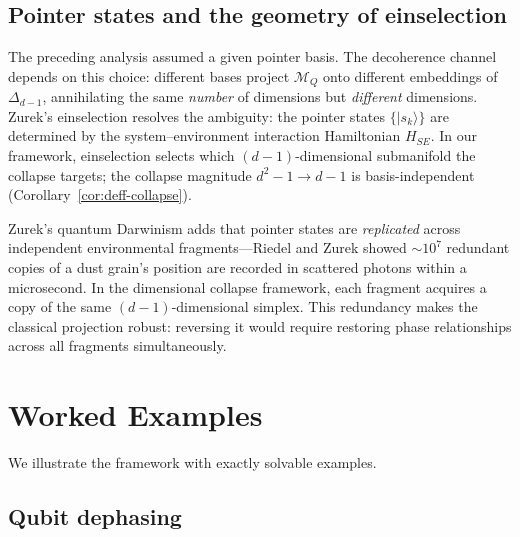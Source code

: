 \documentclass[12pt,a4paper]{article}
\theoremstyle{definition}
\theoremstyle{remark}
\begin{document}
\subsection{Pointer states and the geometry of einselection}
\label{sec:pointer}

The preceding analysis assumed a given pointer basis.  The decoherence channel depends on this choice: different bases project $\mathcal{M}_Q$ onto different embeddings of $\Delta_{d-1}$, annihilating the same \emph{number} of dimensions but \emph{different} dimensions.  Zurek's einselection \cite{zurek2003decoherence,zurek2025decoherence} resolves the ambiguity: the pointer states $\{|s_k\rangle\}$ are determined by the system--environment interaction Hamiltonian $H_{SE}$.  In our framework, einselection selects which $(d-1)$-dimensional submanifold the collapse targets; the collapse magnitude $d^2 - 1 \to d - 1$ is basis-independent (Corollary~\ref{cor:deff-collapse}).

Zurek's quantum Darwinism \cite{zurek2003decoherence,zurek2025decoherence,riedel2010zurek} adds that pointer states are \emph{replicated} across independent environmental fragments---Riedel and Zurek \cite{riedel2010zurek} showed $\sim\!10^7$ redundant copies of a dust grain's position are recorded in scattered photons within a microsecond.  In the dimensional collapse framework, each fragment acquires a copy of the same $(d-1)$-dimensional simplex.  This redundancy makes the classical projection robust: reversing it would require restoring phase relationships across all fragments simultaneously.

\section{Worked Examples}
\label{sec:examples}

We illustrate the framework with exactly solvable examples.

\subsection{Qubit dephasing}
\label{sec:qubit-dephasing}
\end{document}
